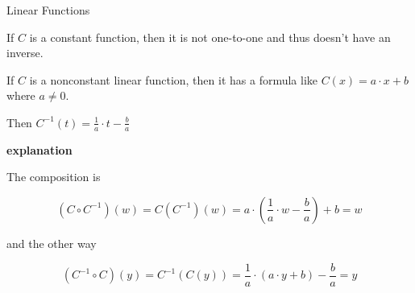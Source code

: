 \documentclass{ximera}
\begin{document}
\begin{example} Linear Functions

If $C$ is a constant function, then it is not one-to-one and thus doesn't have an inverse. 


If $C$ is a nonconstant linear function, then it has a formula like $C(x) = a \cdot x + b$ where $a \ne 0$.


Then $C^{-1}(t) = \frac{1}{a} \cdot t - \frac{b}{a}$


\textbf{\textcolor{red!75!green}{explanation}}



The composition is 

\[  (C \circ C^{-1})(w) = C(C^{-1})(w) =     a \cdot \left(\frac{1}{a} \cdot w - \frac{b}{a}\right) + b  = w \]


and the other way


\[  (C^{-1} \circ C)(y) = C^{-1}(C(y)) =     \frac{1}{a} \cdot (a \cdot y + b) - \frac{b}{a}  = y \]




\end{example}
\end{document}
